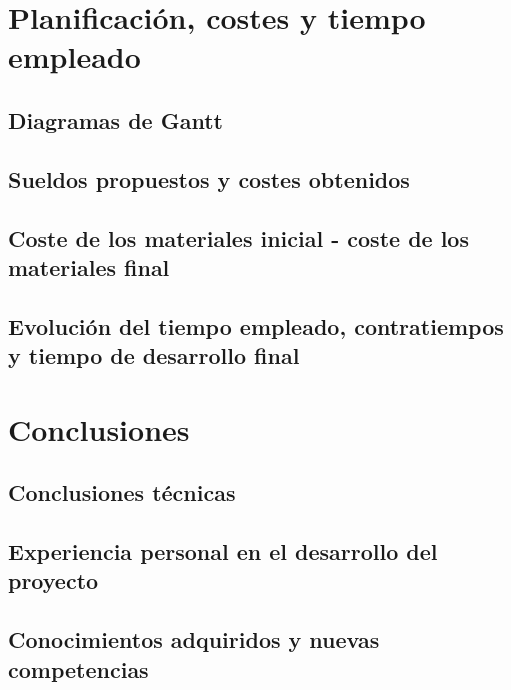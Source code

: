 \chapter{Planificación, costes y tiempo empleado}

\section{Diagramas de Gantt}

\section{Sueldos propuestos y costes obtenidos}

\section{Coste de los materiales inicial - coste de los materiales final}

%
\section{Evolución del tiempo empleado, contratiempos y tiempo de desarrollo final}


\chapter{Conclusiones}

\section{Conclusiones técnicas}

\section{Experiencia personal en el desarrollo del proyecto}

\section{Conocimientos adquiridos y nuevas competencias}


